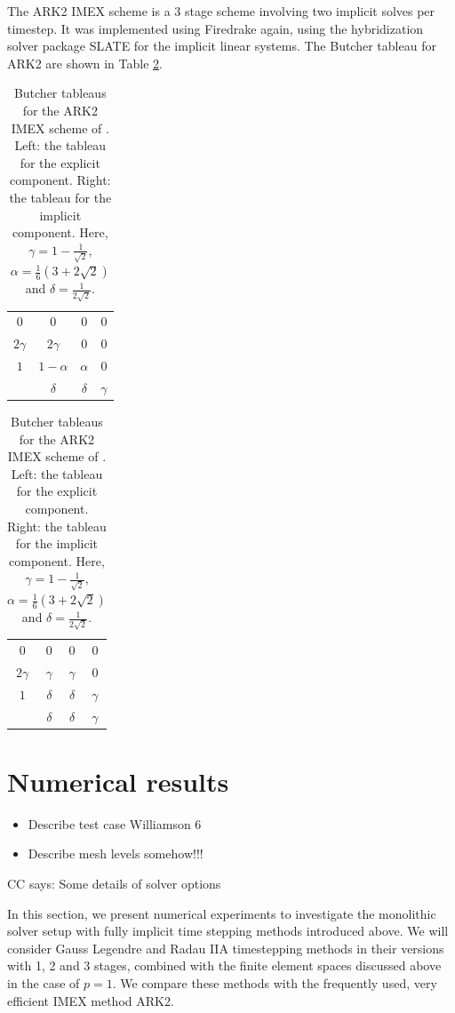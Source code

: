 \documentclass[a4paper, 12pt]{article}
\newcommand{\colin}[1]{{\color{blue}CC says: #1}}
\begin{document}
The ARK2 IMEX scheme is a 3 stage scheme involving two implicit solves
per timestep. It was implemented using Firedrake again, using the
hybridization solver package SLATE \citep{gibson2020slate} for the
implicit linear systems. The Butcher tableau for ARK2 are shown in Table
\ref{tab:ARK2}.

\begin{table}\centering
\begin{tabular}{c|ccc}
0         &  0             &   0       & 0  \\
$2\gamma$ &  $2\gamma$     &  0        & 0  \\
$1$       & $1 - \alpha$   & $\alpha$  & 0  \\ \hline
          & $\delta$       & $\delta$  & $\gamma$
\end{tabular}
\hspace{4mm}
\begin{tabular}{c|ccc}
0         &  0             &   0       & 0  \\
$2\gamma$ &  $\gamma$     &  $\gamma$        & 0  \\
$1$       & $\delta $   & $\delta$  & $\gamma$  \\ \hline
          & $\delta$       & $\delta$  & $\gamma$
\end{tabular}
\caption{\label{tab:ARK2}Butcher tableaus for the ARK2 IMEX scheme of
  \citet{giraldo2013implicit}. Left: the tableau for the explicit component.
  Right: the tableau for the implicit component.
   Here, $\gamma = 1 -
  \frac{1}{\sqrt{2}}$, $\alpha = \frac{1}{6} (3 + 2\sqrt{2})$ and
  $\delta = \frac{1}{ 2 \sqrt{2}}$.}
\end{table}

\section{Numerical results}

\begin{itemize}
 \item Describe test case Williamson 6
 \item Describe mesh levels somehow!!!
\end{itemize}

\colin{Some details of solver options}

In this section, we present numerical experiments to investigate the
monolithic solver setup with fully implicit time stepping methods
introduced above. We will consider Gauss Legendre and Radau IIA
timestepping methods in their versions with 1, 2 and 3 stages,
combined with the finite element spaces discussed above in the case of
$p=1$. We compare these methods with the frequently used, very
efficient IMEX method ARK2.
\end{document}
